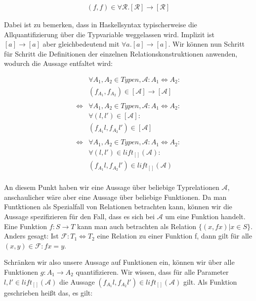 \documentclass[11pt]{article} %
\begin{document}
\begin{align}
(f, f) \in \forall \mathcal{R} . [\mathcal{R}] \rightarrow [\mathcal{R}]
\end{align}

Dabei ist zu bemerken, dass in Haskellsyntax typischerweise die Allquantifizierung über die Typvariable weggelassen wird.
Implizit ist $[a] \rightarrow [a]$ aber gleichbedeutend mit $\forall a . [a] \rightarrow [a]$.
Wir können nun Schritt für Schritt die Definitionen der einzelnen Relationskonstruktionen anwenden, wodurch die Aussage
entfaltet wird:

\begin{align*}
&\forall A_1, A_2 \in Typen, \mathcal{A} : A_1 \Leftrightarrow A_2: \\
&(f_{A_1}, f_{A_2}) \in [\mathcal{A}] \rightarrow [\mathcal{A}] \\
& \\
\Leftrightarrow &
\forall A_1, A_2 \in Typen, \mathcal{A} : A_1 \Leftrightarrow A_2: \\
& \forall (l, l') \in [\mathcal{A}]: \\
&(f_{A_1} l, f_{A_2} l') \in [\mathcal{A}] \\
& \\
\Leftrightarrow &
\forall A_1, A_2 \in Typen, \mathcal{A} : A_1 \Leftrightarrow A_2: \\
& \forall (l, l') \in lift_{[]}(\mathcal{A}): \\
& (f_{A_1} l, f_{A_2} l') \in lift_{[]}(\mathcal{A}) \\
\end{align*}

An diesem Punkt haben wir eine Aussage über beliebige Typrelationen $\mathcal{A}$, anschaulicher wäre aber eine Aussage
über beliebige Funktionen. Da man Funtktionen als Spezialfall von Relationen betrachten kann, können wir die Aussage
spezifizieren für den Fall, dass es sich bei $\mathcal{A}$ um eine Funktion handelt.
Eine Funktion $f : S \rightarrow T$ kann man auch betrachten als Relation $\{ (x, f x) | x \in S \}$. Anders gesagt: Ist
$\mathcal{F} : T_1 \Leftrightarrow T_2$ eine Relation zu einer Funktion f, dann gilt für alle $(x, y) \in \mathcal{F}: f x = y$.

Schränken wir also unsere Aussage auf Funktionen ein, können wir über alle Funktionen $g : A_1 \rightarrow A_2$ quantifizieren.
Wir wissen, dass für alle Parameter $l, l' \in lift_{[]}(\mathcal{A})$ die Aussage $(f_{A_1} l, f_{A_2} l') \in lift_{[]}(\mathcal{A})$
gilt. Als Funktion geschrieben heißt das, es gilt:
\end{document}
